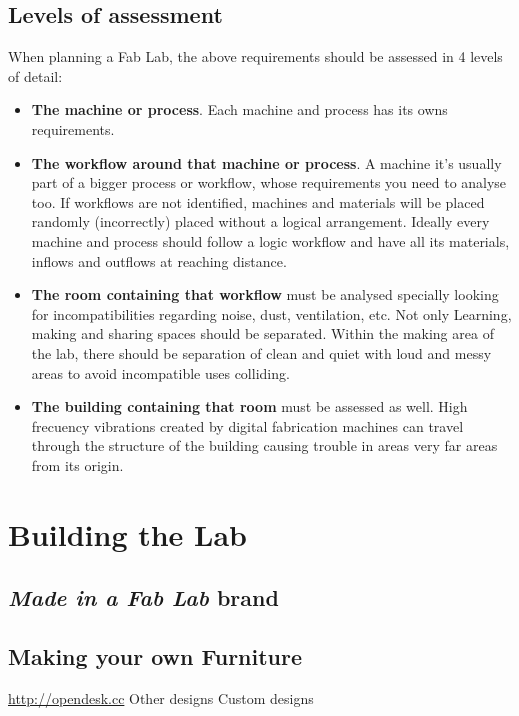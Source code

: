 \documentclass[a4paper,12pt,titlepage]{article}
\begin{document}
\subsection{Levels of assessment}
When planning a Fab Lab, the above requirements should be assessed in 4 levels of detail:
\begin{itemize}
\item \textbf{The machine or process}. Each machine and process has its owns requirements.
\item \textbf{The workflow around that machine or process}. A machine it's usually part of a bigger process or workflow, whose requirements you need to analyse too. If workflows
are not identified, machines and materials will be  placed randomly (incorrectly) placed without a
logical arrangement. Ideally every machine and process should follow a logic workflow and
have all its materials, inflows and outflows at reaching distance.

\item \textbf{The room containing that workflow} must be analysed specially looking for incompatibilities regarding noise, dust, ventilation, etc. Not only Learning, making and sharing spaces should be separated. Within the making
area of the lab, there should be separation of clean and quiet with loud and messy areas to avoid incompatible uses colliding.
\item \textbf{The building containing that room} must be assessed as well. High frecuency vibrations created by digital fabrication machines can travel through the structure of the building causing trouble in areas very far areas from its origin.
\end{itemize}

\clearpage

\section{Building the Lab}

\subsection{\textit{Made in a Fab Lab} brand}

\subsection{Making your own Furniture}

\url{http://opendesk.cc}
Other designs
Custom designs
\end{document}
